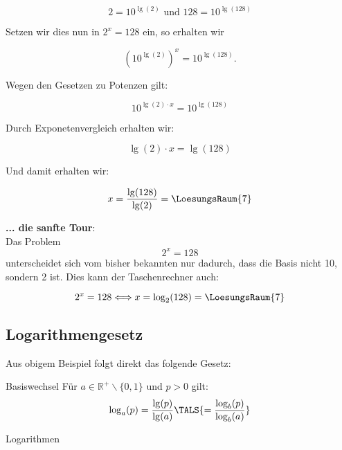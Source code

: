 $$2= 10^{\lg(2)} \textrm{ und } 128 = 10^{\lg(128)}$$

Setzen wir dies nun in $2^x=128$ ein, so erhalten wir

$$\left(10^{\lg(2)}\right)^x = 10^{\lg(128)}.$$


Wegen den Gesetzen zu Potenzen gilt:

$$10^{\lg(2)\cdot{}x} = 10^{\lg(128)}$$

  Durch Exponetenvergleich erhalten wir:

  $$\lg(2)\cdot{}x = \lg(128)$$

  Und damit erhalten wir:

  $$x = \frac{\lg(128)}{\lg(2)} = \LoesungsRaum{7}$$


  \textbf{... die sanfte Tour}:\\

 Das Problem $$2^x=128$$ unterscheidet sich vom bisher bekannten nur
 dadurch, dass die Basis nicht 10, sondern 2 ist. Dies kann der
 Taschenrechner auch: 

 $$2^x = 128 \Longleftrightarrow  x = \log_2(128) = \LoesungsRaum{7}$$
 \newpage
\subsection{Logarithmengesetz}
Aus obigem Beispiel folgt direkt das folgende Gesetz:

\begin{gesetz}{Basiswechsel}{}
  Für $a\in\mathbb{R}^{+}\backslash\{0,1\}$ und $p>0$ gilt:
  $$\log_a(p) = \frac{\lg(p)}{\lg(a)}\TALS{ = \frac{\log_b(p)}{\log_b(a)}}$$
\end{gesetz}

\begin{beispiel}{Logarithmen}{}
\end{beispiel}

%

\newpage


